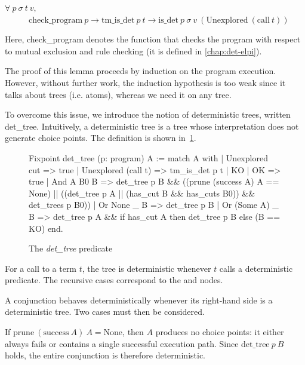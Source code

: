 % 
\begin{theorem}\label{th:detcheckcall}$\forall\ p\ \sigma\ t\ v ,$
  \vspace{.8em}\\
	$\phantom{xxxxx} \mathrm{check\_program}\ p \to \mathrm{tm\_is\_det}\ p\ t \to \mathrm{is\_det}\ p\ \sigma\ v\ ( \mathrm{Unexplored}\ ( \mathrm{call}\ t ) ) $
\end{theorem}

Here, check\_program denotes the function that checks the program
with respect to mutual exclusion and rule checking (it is defined in
\cref{chap:det-elpi}). %

The proof of this lemma proceeds by induction on
the program execution. However, without further work,
the induction
hypothesis is too weak since it talks about \taC trees (i.e. atoms),
whereas we need it on any tree.

To overcome this issue, we introduce the notion of deterministic trees,
written det\_tree. Intuitively, a deterministic tree is a tree
whose interpretation does not generate choice points. The definition is
shown in~\cref{fig:dettree}.

\begin{figure}
\begin{coqcode}
  Fixpoint det_tree (p: program) A :=
    match A with
    | Unexplored cut => true
    | Unexplored (call t) => tm_is_det p t
    | KO | OK => true
    | And A B0 B =>
        det_tree p B &&
        ((prune (success A) A == None) ||
         ((det_tree p A || (has_cut B && has_cuts B0)) && det_trees p B0))
    | Or None _ B => det_tree p B
    | Or (Some A) _ B =>
        det_tree p A && if has_cut A then det_tree p B else (B == KO)
    end.
\end{coqcode}
\caption{The \emph{det\_tree} predicate\label{fig:dettree}}
\end{figure}

For a call to a term $t$, the tree is deterministic whenever $t$ calls a
deterministic predicate. The recursive cases correspond to the \andC and
\orC nodes.

A conjunction behaves deterministically whenever its right-hand side is a
deterministic tree. Two cases must then be considered.

If $\mathrm{prune}\ (\mathrm{success}\ A)\ A = \mathrm{None}$, then $A$ produces
no choice points: it either always fails or contains a single successful
execution path. Since $\mathrm{det\_tree}\ p\ B$ holds, the entire conjunction
is therefore deterministic.


